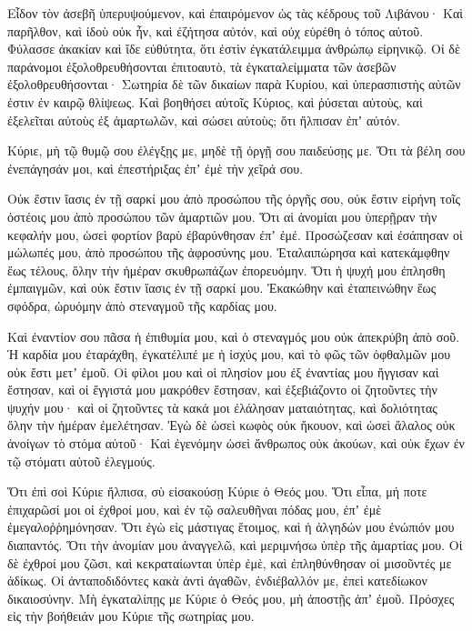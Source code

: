 \begin{spacing}{1.1}
\begin{multicols}{2}
Εἶδον τὸν ἀσεβῆ ὑπερυψούμενον, καὶ ἐπαιρόμενον ὡς τὰς κέδρους τοῦ Λιβάνου·
Καὶ παρῆλθον, καὶ ἰδοὺ οὐκ ἦν, καὶ ἐζήτησα αὐτόν, καὶ οὐχ εὑρέθη ὁ τόπος αὐτοῦ.
Φύλασσε ἀκακίαν καὶ ἴδε εὐθύτητα, ὅτι ἐστὶν ἐγκατάλειμμα ἀνθρώπῳ εἰρηνικῷ.
Οἱ δὲ παράνομοι ἐξολοθρευθήσονται ἐπιτοαυτὸ, τὰ ἐγκαταλείμματα τῶν ἀσεβῶν ἐξολοθρευθήσονται·
Σωτηρία δὲ τῶν δικαίων παρὰ Κυρίου, καὶ ὑπερασπιστὴς αὐτῶν ἐστιν ἐν καιρῷ θλίψεως.
Καὶ βοηθήσει αὐτοῖς Κύριος, καὶ ῥύσεται αὐτοὺς, καὶ ἐξελεῖται αὐτοὺς ἐξ ἁμαρτωλῶν, καὶ σώσει αὐτοὺς; ὅτι ἤλπισαν ἐπʼ αὐτόν.

Κύριε, μὴ τῷ θυμῷ σου ἐλέγξῃς με, μηδὲ τῇ ὀργῇ σου παιδεύσῃς με.
Ὅτι τὰ βέλη σου ἐνεπάγησάν μοι, καὶ ἐπεστήριξας ἐπʼ ἐμὲ τὴν χεῖρά σου.

Οὐκ ἔστιν ἴασις ἐν τῇ σαρκί μου ἀπὸ προσώπου τῆς ὀργῆς σου, οὐκ ἔστιν εἰρήνη τοῖς ὀστέοις μου ἀπὸ προσώπου τῶν ἁμαρτιῶν μου.
Ὅτι αἱ ἀνομίαι μου ὑπερῇραν τὴν κεφαλήν μου, ὡσεὶ φορτίον βαρὺ ἐβαρύνθησαν ἐπʼ ἐμέ.
Προσώζεσαν καὶ ἐσάπησαν οἱ μώλωπές μου, ἀπὸ προσώπου τῆς ἀφροσύνης μου.
Ἐταλαιπώρησα καὶ κατεκάμφθην ἕως τέλους, ὅλην τὴν ἡμέραν σκυθρωπάζων ἐπορευόμην.
Ὅτι ἡ ψυχή μου ἐπλησθη ἐμπαιγμῶν, καὶ οὐκ ἔστιν ἴασις ἐν τῇ σαρκί μου.
Ἐκακώθην καὶ ἐταπεινώθην ἕως σφόδρα, ὠρυόμην ἀπὸ στεναγμοῦ τῆς καρδίας μου.

Καὶ ἐναντίον σου πᾶσα ἡ ἐπιθυμία μου, καὶ ὁ στεναγμός μου οὐκ ἀπεκρύβη ἀπὸ σοῦ.
Ἡ καρδία μου ἐταράχθη, ἐγκατέλιπέ με ἡ ἰσχύς μου, καὶ τὸ φῶς τῶν ὀφθαλμῶν μου οὐκ ἔστι μετʼ ἐμοῦ.
Οἱ φίλοι μου καὶ οἱ πλησίον μου ἐξ ἐναντίας μου ἤγγισαν καὶ ἔστησαν, καὶ οἱ ἔγγιστά μου μακρόθεν ἔστησαν,
καὶ ἐξεβιάζοντο οἱ ζητοῦντες τὴν ψυχήν μου· καὶ οἱ ζητοῦντες τὰ κακά μοι ἐλάλησαν ματαιότητας, καὶ δολιότητας ὅλην τὴν ἡμέραν ἐμελέτησαν.
Ἐγὼ δὲ ὡσεὶ κωφὸς οὐκ ἤκουον, καὶ ὡσεὶ ἄλαλος οὐκ ἀνοίγων τὸ στόμα αὐτοῦ·
Καὶ ἐγενόμην ὡσεὶ ἄνθρωπος οὐκ ἀκούων, καὶ οὐκ ἔχων ἐν τῷ στόματι αὐτοῦ ἐλεγμούς.

Ὅτι ἐπὶ σοὶ Κύριε ἤλπισα, σὺ εἰσακούσῃ Κύριε ὁ Θεός μου.
Ὅτι εἶπα, μή ποτε ἐπιχαρῶσί μοι οἱ ἐχθροί μου, καὶ ἐν τῷ σαλευθῆναι πόδας μου, ἐπʼ ἐμὲ ἐμεγαλοῤῥημόνησαν.
Ὅτι ἐγὼ εἰς μάστιγας ἕτοιμος, καὶ ἡ ἀλγηδών μου ἐνώπιόν μου διαπαντός.
Ὅτι τὴν ἀνομίαν μου ἀναγγελῶ, καὶ μεριμνήσω ὑπὲρ τῆς ἁμαρτίας μου.
Οἱ δὲ ἐχθροί μου ζῶσι, καὶ κεκραταίωνται ὑπὲρ ἐμὲ, καὶ ἐπληθύνθησαν οἱ μισοῦντές με ἀδίκως.
Οἱ ἀνταποδιδόντες κακὰ ἀντὶ ἀγαθῶν, ἐνδιέβαλλόν με, ἐπεὶ κατεδίωκον δικαιοσύνην.
Μὴ ἐγκαταλίπῃς με Κύριε ὁ Θεός μου, μὴ ἀποστῇς ἀπʼ ἐμοῦ.
Πρόσχες εἰς τὴν βοήθειάν μου Κύριε τῆς σωτηρίας μου.


\end{multicols}
\end{spacing}
